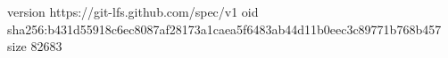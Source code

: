 version https://git-lfs.github.com/spec/v1
oid sha256:b431d55918c6ec8087af28173a1caea5f6483ab44d11b0eec3c89771b768b457
size 82683
